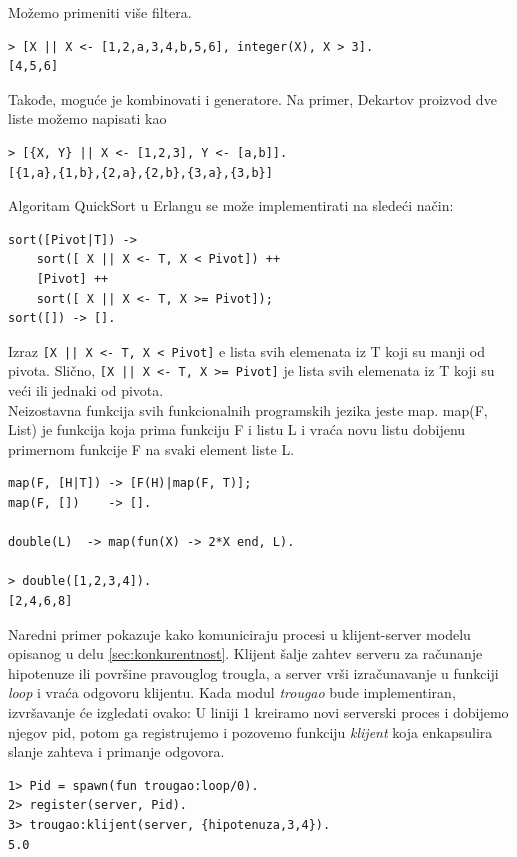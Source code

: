 \documentclass[a4paper]{article}
\begin{document}
{Možemo primeniti više filtera.
\begin{verbatim}
> [X || X <- [1,2,a,3,4,b,5,6], integer(X), X > 3].
[4,5,6]
\end{verbatim}

Takođe, moguće je kombinovati i generatore. Na primer, Dekartov proizvod dve liste možemo napisati kao
\begin{verbatim}
> [{X, Y} || X <- [1,2,3], Y <- [a,b]].
[{1,a},{1,b},{2,a},{2,b},{3,a},{3,b}]
\end{verbatim}

Algoritam QuickSort u Erlangu se može implementirati na sledeći način:
\begin{verbatim}
sort([Pivot|T]) ->
    sort([ X || X <- T, X < Pivot]) ++
    [Pivot] ++
    sort([ X || X <- T, X >= Pivot]);
sort([]) -> [].
\end{verbatim}
Izraz {\texttt{[X || X <- T, X < Pivot]}} e lista svih elemenata iz T koji su manji od pivota. Slično, {\texttt{[X || X <- T, X >= Pivot]}} je lista svih elemenata iz T koji su veći ili jednaki od pivota.\\

Neizostavna funkcija svih funkcionalnih programskih jezika jeste map.
map(F, List) je funkcija koja prima funkciju F i listu L i vraća novu listu dobijenu primernom funkcije F na svaki element liste L.
\begin{verbatim}
map(F, [H|T]) -> [F(H)|map(F, T)];
map(F, [])    -> [].

double(L)  -> map(fun(X) -> 2*X end, L).

> double([1,2,3,4]).
[2,4,6,8]
\end{verbatim}


Naredni primer pokazuje kako komuniciraju procesi u klijent-server modelu opisanog u delu \ref{sec:konkurentnost}.
Klijent šalje zahtev serveru za računanje hipotenuze ili površine pravouglog trougla,
a server vrši izračunavanje u funkciji {\em loop} i vraća odgovoru klijentu. 
Kada modul {\em trougao} bude implementiran, izvršavanje će izgledati ovako: U liniji 1 kreiramo novi serverski proces i dobijemo njegov pid, 
potom ga registrujemo i pozovemo funkciju {\em klijent} koja enkapsulira slanje zahteva i primanje odgovora.
\begin{verbatim}
1> Pid = spawn(fun trougao:loop/0).
2> register(server, Pid).
3> trougao:klijent(server, {hipotenuza,3,4}).
5.0
\end{verbatim}

}
\end{document}
